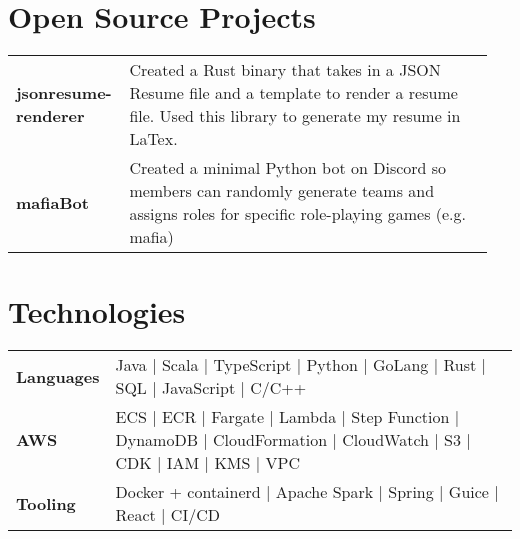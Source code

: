 \documentclass[letterpaper,11pt]{article}
\begin{document}
\section{Open Source Projects}
\begin{tabular*}{\textwidth}{p{0.20\linewidth}p{0.75\linewidth}}
    \small{\textbf{jsonresume-renderer}} & \small{Created a Rust binary that takes in a JSON Resume file and a template to render a resume file. Used this library to generate my resume in LaTex.}\\
    \small{\textbf{mafiaBot}} & \small{Created a minimal Python bot on Discord so members can randomly generate teams and assigns roles for specific role-playing games (e.g. mafia)}\\

\end{tabular*}

\section{Technologies}
\begin{tabular*}{\textwidth}{p{0.12\linewidth}p{0.88\linewidth}}
    \small{\textbf{Languages}} & \small{Java | Scala | TypeScript | Python | GoLang | Rust | SQL | JavaScript | C/C++}\\
    \small{\textbf{AWS}} & \small{ECS | ECR | Fargate | Lambda | Step Function | DynamoDB | CloudFormation | CloudWatch | S3 | CDK | IAM | KMS | VPC}\\
    \small{\textbf{Tooling}} & \small{Docker + containerd | Apache Spark | Spring | Guice | React | CI/CD}\\

\end{tabular*}
\end{document}
